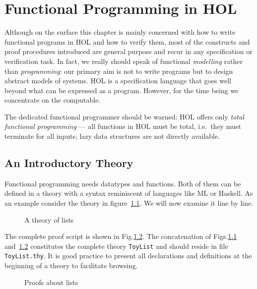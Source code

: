 \chapter{Functional Programming in HOL}

Although on the surface this chapter is mainly concerned with how to write
functional programs in HOL and how to verify them, most of the constructs and
proof procedures introduced are general purpose and recur in any specification
or verification task. In fact, we really should speak of functional
\emph{modelling} rather than \emph{programming}: our primary aim is not
to write programs but to design abstract models of systems.  HOL is
a specification language that goes well beyond what can be expressed as a
program. However, for the time being we concentrate on the computable.

The dedicated functional programmer should be warned: HOL offers only
\emph{total functional programming} --- all functions in HOL must be total,
i.e.\ they must terminate for all inputs; lazy data structures are not
directly available.

\section{An Introductory Theory}
\label{sec:intro-theory}

Functional programming needs datatypes and functions. Both of them can be
defined in a theory with a syntax reminiscent of languages like ML or
Haskell. As an example consider the theory in figure~\ref{fig:ToyList}.
We will now examine it line by line.

\begin{figure}[htbp]
\begin{ttbox}\makeatother
\end{ttbox}
\caption{A theory of lists}
\label{fig:ToyList}
\end{figure}

{\makeatother}

The complete proof script is shown in Fig.\ts\ref{fig:ToyList-proofs}. The
concatenation of Figs.\ts\ref{fig:ToyList} and~\ref{fig:ToyList-proofs}
constitutes the complete theory \texttt{ToyList} and should reside in file
\texttt{ToyList.thy}. It is good practice to present all declarations and
definitions at the beginning of a theory to facilitate browsing.

\begin{figure}[htbp]
\begin{ttbox}\makeatother
\end{ttbox}
\caption{Proofs about lists}
\label{fig:ToyList-proofs}
\end{figure}

